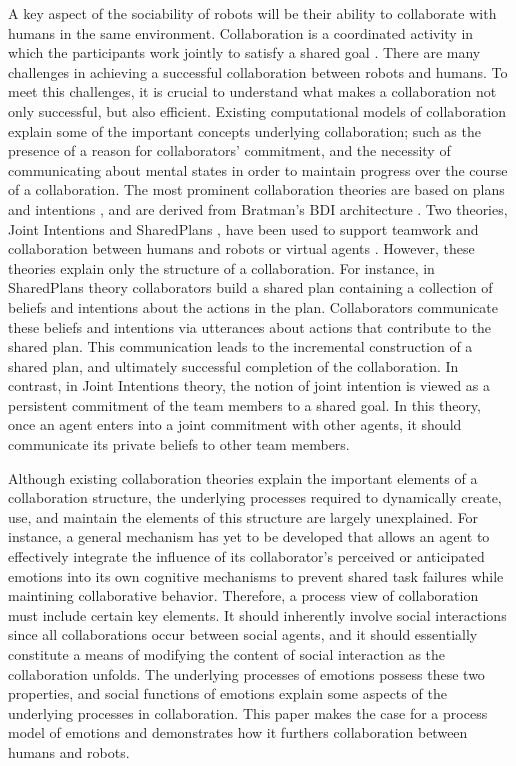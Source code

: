 A key aspect of the sociability of robots will be their ability to collaborate
with humans in the same environment. Collaboration is a coordinated activity in
which the participants work jointly to satisfy a shared goal
\cite{grosz:plans-discourse}. There are many challenges in achieving a
successful collaboration between robots and humans. To meet this challenges, it
is crucial to understand what makes a collaboration not only successful, but
also efficient. Existing computational models of collaboration explain some of
the important concepts underlying collaboration; such as the presence of a
reason for collaborators' commitment, and the necessity of communicating about
mental states in order to maintain progress over the course of a collaboration.
The most prominent collaboration theories are based on plans and intentions
\cite{cohen:teamwork} \cite{grosz:plans-discourse}
\cite{Litman:discourse-commonsense}, and are derived from Bratman's BDI
architecture \cite{bratman:intentions-plans}. Two theories, Joint Intentions
\cite{cohen:teamwork} and SharedPlans
\cite{grosz:planning-acting,grosz:collaboration,grosz:plans-discourse}, have
been used to support teamwork and collaboration between humans and robots or
virtual agents \cite{breazeal:humanoid-robots}
\cite{montreuil:planning-robot-activity} \cite{sidner:enagagement-robot}
\cite{yen:cast}. However, these theories explain only the structure of a
collaboration. For instance, in SharedPlans theory collaborators build a shared
plan containing a collection of beliefs and intentions about the actions in the
plan. Collaborators communicate these beliefs and intentions via utterances
about actions that contribute to the shared plan. This communication leads to
the incremental construction of a shared plan, and ultimately successful
completion of the collaboration. In contrast, in Joint Intentions theory, the
notion of joint intention is viewed as a persistent commitment of the team
members to a shared goal. In this theory, once an agent enters into a joint
commitment with other agents, it should communicate its private beliefs to other
team members.

Although existing collaboration theories explain the important elements of a
collaboration structure, the underlying processes required to dynamically
create, use, and maintain the elements of this structure are largely
unexplained. For instance, a general mechanism has yet to be developed that
allows an agent to effectively integrate the influence of its collaborator's
perceived or anticipated emotions into its own cognitive mechanisms to prevent
shared task failures while maintining collaborative behavior. Therefore, a
process view of collaboration must include certain key elements. It should
inherently involve social interactions since all collaborations occur between
social agents, and it should essentially constitute a means of modifying the
content of social interaction as the collaboration unfolds. The underlying
processes of emotions possess these two properties, and social functions of
emotions explain some aspects of the underlying processes in collaboration. This
paper makes the case for a process model of emotions and demonstrates how it
furthers collaboration between humans and robots.

